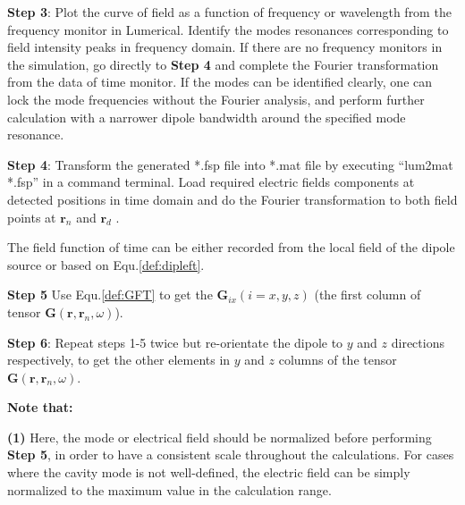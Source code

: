 \textbf{Step 3}: Plot the curve of field as a function of frequency or wavelength from the frequency monitor in Lumerical.
Identify the modes resonances corresponding to field intensity peaks in frequency domain. If there are no frequency monitors in the simulation,
go directly to {\bf Step 4} and complete the Fourier transformation from the data of time monitor.
If the modes can be identified clearly, one can lock the mode frequencies without the Fourier analysis,
and perform further calculation with a narrower dipole bandwidth around the specified mode resonance.

\textbf{Step 4}: Transform the generated *.fsp file into *.mat file by executing ``lum2mat *.fsp'' in a command terminal.
Load required electric fields components at detected positions in time domain and do the Fourier transformation
to both field points at $\mathbf{r}_n$ and $\mathbf{r}_d$ .

The field function of time can be either recorded from the local field of the dipole source or based on Equ.\eqref{def:dipleft}.

\textbf{Step 5} Use Equ.\eqref{def:GFT} to get the $\mathbf{G}_{ix} (i=x, y, z)$
(the first column of tensor $\mathbf{G}(\mathbf{r},\mathbf{r}_n, \omega)$).

\textbf{Step 6}: Repeat steps 1-5 twice but re-orientate the dipole to $y$ and $z$ directions respectively,
to get the other elements in $y$ and $z$ columns of the tensor $\mathbf{G}(\mathbf{r},\mathbf{r}_n, \omega)$.


\bigskip
\noindent \textbf{Note that:}

\textbf{(1)} Here, the mode or electrical field should be normalized before performing \textbf{Step 5},
in order to have a consistent scale throughout the calculations.
For cases where the cavity mode is not well-defined, the electric field can be simply normalized to the maximum value in the calculation range.

